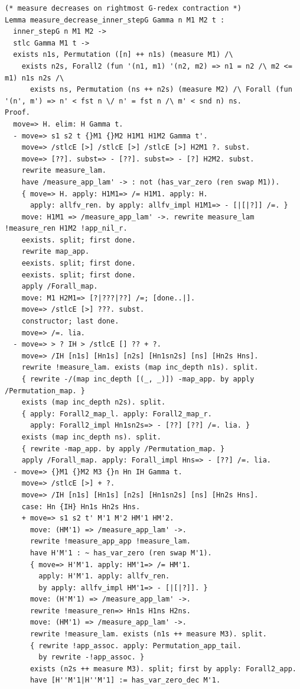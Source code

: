 \begin{lstlisting}[style=authorcoq]
(* measure decreases on rightmost G-redex contraction *)
Lemma measure_decrease_inner_stepG Gamma n M1 M2 t :
  inner_stepG n M1 M2 ->
  stlc Gamma M1 t ->
  exists n1s, Permutation ([n] ++ n1s) (measure M1) /\
    exists n2s, Forall2 (fun '(n1, m1) '(n2, m2) => n1 = n2 /\ m2 <= m1) n1s n2s /\
      exists ns, Permutation (ns ++ n2s) (measure M2) /\ Forall (fun '(n', m') => n' < fst n \/ n' = fst n /\ m' < snd n) ns.
Proof.
  move=> H. elim: H Gamma t.
  - move=> s1 s2 t {}M1 {}M2 H1M1 H1M2 Gamma t'.
    move=> /stlcE [>] /stlcE [>] /stlcE [>] H2M1 ?. subst.
    move=> [??]. subst=> - [??]. subst=> - [?] H2M2. subst.
    rewrite measure_lam.
    have /measure_app_lam' -> : not (has_var_zero (ren swap M1)).
    { move=> H. apply: H1M1=> /= H1M1. apply: H.
      apply: allfv_ren. by apply: allfv_impl H1M1=> - [|[|?]] /=. }
    move: H1M1 => /measure_app_lam' ->. rewrite measure_lam !measure_ren H1M2 !app_nil_r.
    eexists. split; first done.
    rewrite map_app.
    eexists. split; first done.
    eexists. split; first done.
    apply /Forall_map.
    move: M1 H2M1=> [?|???|??] /=; [done..|].
    move=> /stlcE [>] ???. subst.
    constructor; last done.
    move=> /=. lia.
  - move=> > ? IH > /stlcE [] ?? + ?.
    move=> /IH [n1s] [Hn1s] [n2s] [Hn1sn2s] [ns] [Hn2s Hns].
    rewrite !measure_lam. exists (map inc_depth n1s). split.
    { rewrite -/(map inc_depth [(_, _)]) -map_app. by apply /Permutation_map. }
    exists (map inc_depth n2s). split.
    { apply: Forall2_map_l. apply: Forall2_map_r.
      apply: Forall2_impl Hn1sn2s=> - [??] [??] /=. lia. }
    exists (map inc_depth ns). split.
    { rewrite -map_app. by apply /Permutation_map. }
    apply /Forall_map. apply: Forall_impl Hns=> - [??] /=. lia.
  - move=> {}M1 {}M2 M3 {}n Hn IH Gamma t.
    move=> /stlcE [>] + ?.
    move=> /IH [n1s] [Hn1s] [n2s] [Hn1sn2s] [ns] [Hn2s Hns].
    case: Hn {IH} Hn1s Hn2s Hns.
    + move=> s1 s2 t' M'1 M'2 HM'1 HM'2.
      move: (HM'1) => /measure_app_lam' ->.
      rewrite !measure_app_app !measure_lam.
      have H'M'1 : ~ has_var_zero (ren swap M'1).
      { move=> H'M'1. apply: HM'1=> /= HM'1.
        apply: H'M'1. apply: allfv_ren.
        by apply: allfv_impl HM'1=> - [|[|?]]. }
      move: (H'M'1) => /measure_app_lam' ->.
      rewrite !measure_ren=> Hn1s H1ns H2ns.
      move: (HM'1) => /measure_app_lam' ->.
      rewrite !measure_lam. exists (n1s ++ measure M3). split.
      { rewrite !app_assoc. apply: Permutation_app_tail.
        by rewrite -!app_assoc. }
      exists (n2s ++ measure M3). split; first by apply: Forall2_app.
      have [H''M'1|H''M'1] := has_var_zero_dec M'1.

\end{lstlisting}

